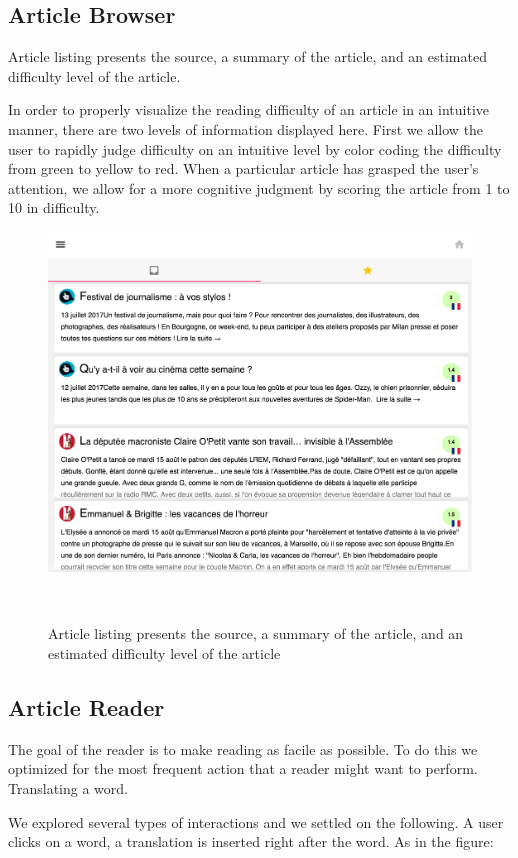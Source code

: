 \newpage
\subsection{Article Browser}

Article listing presents the source, a summary of the article, and an estimated difficulty level of the article.

In order to properly visualize the reading difficulty of an article in an intuitive manner, there are two levels of information displayed here. First we allow the user to rapidly judge difficulty on an intuitive level by color coding the difficulty from green to yellow to red. When a particular article has grasped the user’s attention, we allow for a more cognitive judgment by scoring the article from 1 to 10 in difficulty.

\begin{figure}[h!]
\centering
  \includegraphics[width=0.7\columnwidth]{figures/article_listing}
  \caption{Article listing presents the source, a summary of the article, and an estimated difficulty level of the article }~\label{fig:registrations}
\end{figure}


\subsection{Article Reader}

The goal of the reader is to make reading as facile as possible. To do this we optimized for the most frequent action that a reader might want to perform. Translating a word. 

We explored several types of interactions and we settled on the following. 
A user clicks on a word, a translation is inserted right after the word. As in the figure: 


